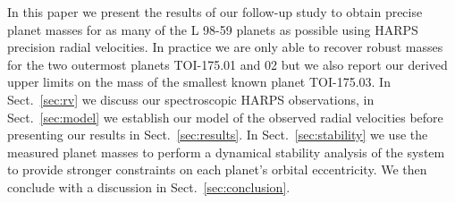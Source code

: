 \documentclass[longauth]{aa}
\begin{document}
In this paper we present the results of our follow-up study to obtain precise planet masses for as many of the L 98-59 planets as possible using HARPS precision radial velocities. In practice we are only able to recover robust masses for the two outermost planets TOI-175.01 and 02 but we also report our derived upper limits on the mass of the smallest known planet TOI-175.03. In Sect.~\ref{sec:rv} we discuss our spectroscopic HARPS observations, in Sect.~\ref{sec:model} we establish our model of the observed radial velocities before presenting our results in Sect.~\ref{sec:results}. In Sect.~\ref{sec:stability} we use the measured planet masses to perform a dynamical stability analysis of the system to provide stronger constraints on each planet's orbital eccentricity. We then conclude with a discussion in Sect.~\ref{sec:conclusion}.
\end{document}
